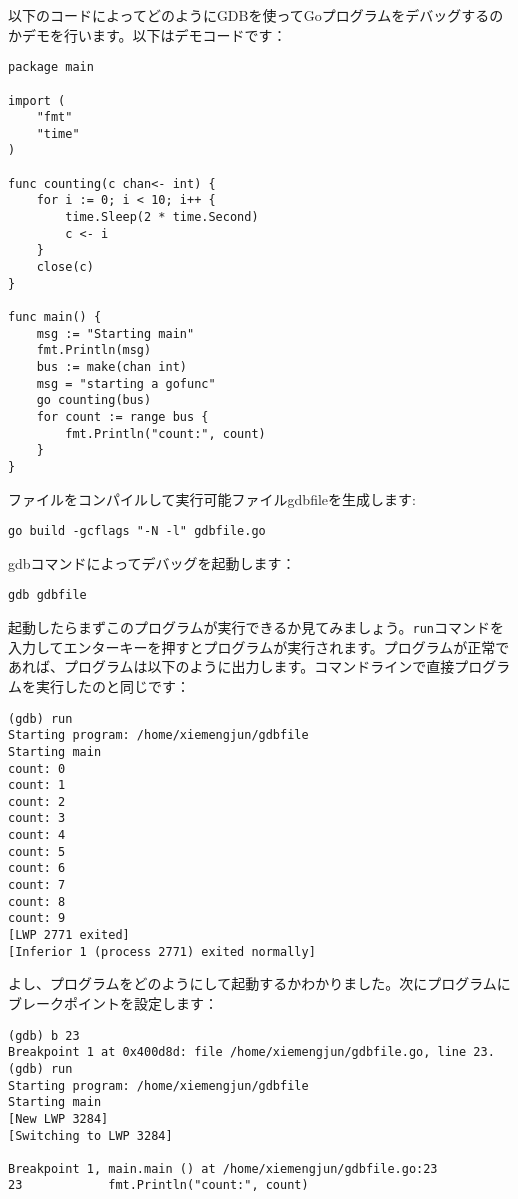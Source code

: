 以下のコードによってどのようにGDBを使ってGoプログラムをデバッグするのかデモを行います。以下はデモコードです：

\begin{lstlisting}[numbers=none]
package main

import (
    "fmt"
    "time"
)

func counting(c chan<- int) {
    for i := 0; i < 10; i++ {
        time.Sleep(2 * time.Second)
        c <- i
    }
    close(c)
}

func main() {
    msg := "Starting main"
    fmt.Println(msg)
    bus := make(chan int)
    msg = "starting a gofunc"
    go counting(bus)
    for count := range bus {
        fmt.Println("count:", count)
    }
}
\end{lstlisting}

ファイルをコンパイルして実行可能ファイルgdbfileを生成します:

\begin{lstlisting}[numbers=none]
go build -gcflags "-N -l" gdbfile.go
\end{lstlisting}

gdbコマンドによってデバッグを起動します：

\begin{lstlisting}[numbers=none]
gdb gdbfile
\end{lstlisting}

起動したらまずこのプログラムが実行できるか見てみましょう。\texttt{run}コマンドを入力してエンターキーを押すとプログラムが実行されます。プログラムが正常であれば、プログラムは以下のように出力します。コマンドラインで直接プログラムを実行したのと同じです：

\begin{lstlisting}[numbers=none]
(gdb) run
Starting program: /home/xiemengjun/gdbfile 
Starting main
count: 0
count: 1
count: 2
count: 3
count: 4
count: 5
count: 6
count: 7
count: 8
count: 9
[LWP 2771 exited]
[Inferior 1 (process 2771) exited normally]    
\end{lstlisting}

よし、プログラムをどのようにして起動するかわかりました。次にプログラムにブレークポイントを設定します：

\begin{lstlisting}[numbers=none]
(gdb) b 23
Breakpoint 1 at 0x400d8d: file /home/xiemengjun/gdbfile.go, line 23.
(gdb) run
Starting program: /home/xiemengjun/gdbfile 
Starting main
[New LWP 3284]
[Switching to LWP 3284]

Breakpoint 1, main.main () at /home/xiemengjun/gdbfile.go:23
23            fmt.Println("count:", count)
\end{lstlisting}

